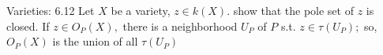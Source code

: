 \documentclass[11pt]{article}
\begin{document}
\begin{problem}{Varieties: 6.12}{}
Let $X$ be a variety, $z\in k(X).$ show that the pole set of $z$ is closed. If $z\in O_P(X),$ there is a neighborhood $U_P$ of $P$ s.t. $z\in \tau(U_P);$ so, $O_P(X)$ is the union of all $\tau (U_P)$
\end{problem}


\end{document}
